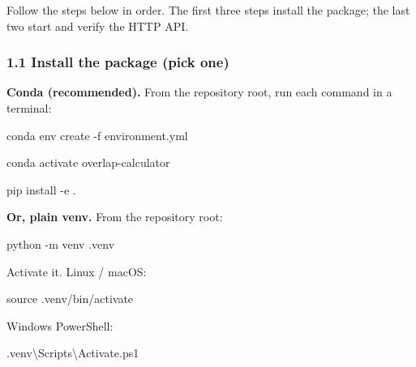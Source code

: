 \documentclass[
  11pt,
]{article}
\newenvironment{Shaded}{}{}
\newcommand{\AttributeTok}[1]{\textcolor[rgb]{0.49,0.56,0.16}{#1}}
\newcommand{\BuiltInTok}[1]{#1}
\newcommand{\ExtensionTok}[1]{#1}
\newcommand{\FunctionTok}[1]{\textcolor[rgb]{0.02,0.16,0.49}{#1}}
\newcommand{\NormalTok}[1]{#1}
\newcommand{\OperatorTok}[1]{\textcolor[rgb]{0.40,0.40,0.40}{#1}}
\begin{document}
Follow the steps below in order. The first three steps install the
package; the last two start and verify the HTTP API.

\hypertarget{11-install-the-package-pick-one}{
\subsubsection{1.1 Install the package (pick
one)}\label{11-install-the-package-pick-one}}

\textbf{Conda (recommended).} From the repository root, run each command
in a terminal:

\begin{Shaded}
\begin{Highlighting}[]
\ExtensionTok{conda}\NormalTok{ env create }\AttributeTok{{-}f}\NormalTok{ environment.yml}
\end{Highlighting}
\end{Shaded}

\begin{Shaded}
\begin{Highlighting}[]
\ExtensionTok{conda}\NormalTok{ activate overlap{-}calculator}
\end{Highlighting}
\end{Shaded}

\begin{Shaded}
\begin{Highlighting}[]
\ExtensionTok{pip}\NormalTok{ install }\AttributeTok{{-}e}\NormalTok{ .}
\end{Highlighting}
\end{Shaded}

\textbf{Or, plain venv.} From the repository root:

\begin{Shaded}
\begin{Highlighting}[]
\ExtensionTok{python} \AttributeTok{{-}m}\NormalTok{ venv .venv}
\end{Highlighting}
\end{Shaded}

Activate it. Linux / macOS:

\begin{Shaded}
\begin{Highlighting}[]
\BuiltInTok{source}\NormalTok{ .venv/bin/activate}
\end{Highlighting}
\end{Shaded}

Windows PowerShell:

\begin{Shaded}
\begin{Highlighting}[]
\OperatorTok{.}\FunctionTok{venv}\NormalTok{\textbackslash{}Scripts\textbackslash{}Activate}\OperatorTok{.}\FunctionTok{ps1}
\end{Highlighting}
\end{Shaded}
\end{document}
